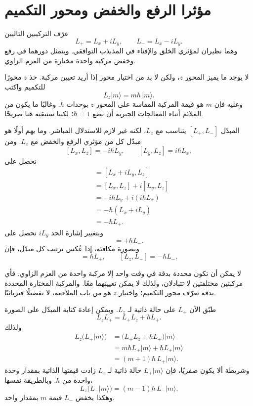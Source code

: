 \section{مؤثرا الرفع والخفض ومحور التكميم}

عرّف التركيبين التاليين
\begin{equation}
L_+=L_x+iL_y,
\qquad
L_-=L_x-iL_y.
\end{equation}
وهما نظيران لمؤثري الخلق والإفناء في المذبذب التوافقي. ويتمثل دورهما في رفع وخفض مركبة واحدة مختارة من العزم الزاوي.

لا يوجد ما يميز المحور \(z\)، ولكن لا بد من اختيار محور إذا أريد تعيين مركبة. خذ \(z\) محورًا للتكميم واكتب
\begin{equation}
L_z\lvert m\rangle=m\hbar\,\lvert m\rangle.
\end{equation}
وعليه فإن \(m\) هو قيمة المركبة المقاسة على المحور \(z\) بوحدات \(\hbar\). وغالبًا ما يكون من الملائم أثناء المعالجات الجبرية أن نضع \(\hbar=1\)؛ لكننا سنبقيه هنا صريحًا.

المبدّل \([L_+,L_-]\) يتناسب مع \(L_z\)، لكنه غير لازم للاستدلال المباشر. وما يهم أولًا هو مبدّل كل من مؤثري الرفع والخفض مع \(L_z\). ومن
\[
[L_x,L_z]=-i\hbar L_y,
\qquad
[L_y,L_z]=i\hbar L_x,
\]
نحصل على
\begin{align}
[L_+,L_z]
&=[L_x+iL_y,L_z] \\
&=[L_x,L_z]+i[L_y,L_z] \\
&=-i\hbar L_y+i(i\hbar L_x) \\
&=-\hbar(L_x+iL_y) \\
&=-\hbar L_+.
\end{align}
وبتغيير إشارة الحد \(iL_y\) نحصل على
\begin{equation}
[L_-,L_z]=+\hbar L_-.
\end{equation}
وبصورة مكافئة، إذا عُكس ترتيب كل مبدّل، فإن
\begin{equation}
[L_z,L_+]=\hbar L_+,
\qquad
[L_z,L_-]=-\hbar L_-.
\end{equation}

لا يمكن أن تكون محددة بدقة في وقت واحد إلا مركبة واحدة من العزم الزاوي. فأي مركبتين مختلفتين لا تتبادلان، ولذلك لا يمكن تعيينهما معًا. والمركبة المختارة المحددة بدقة تعرّف محور التكميم؛ واختيار \(z\) هو من باب الملاءمة، لا تفضيلًا فيزيائيًا.

طبّق الآن \(L_+\) على حالة ذاتية لـ \(L_z\). ويمكن إعادة كتابة المبدّل على الصورة
\begin{equation}
L_zL_+=L_+L_z+\hbar L_+.
\end{equation}
ولذلك
\begin{align}
L_z\bigl(L_+\lvert m\rangle\bigr)
&=\bigl(L_+L_z+\hbar L_+\bigr)\lvert m\rangle \\
&=m\hbar L_+\lvert m\rangle+\hbar L_+\lvert m\rangle \\
&=(m+1)\hbar\,L_+\lvert m\rangle.
\end{align}
وشريطة ألا يكون صفريًا، فإن \(L_+\lvert m\rangle\) حالة ذاتية لـ \(L_z\) زادت قيمتها الذاتية بمقدار وحدة واحدة من \(\hbar\). وبالطريقة نفسها،
\begin{equation}
L_z\bigl(L_-\lvert m\rangle\bigr)
=(m-1)\hbar\,L_-\lvert m\rangle.
\end{equation}
وهكذا يخفض \(L_-\) قيمة \(m\) بمقدار واحد.

